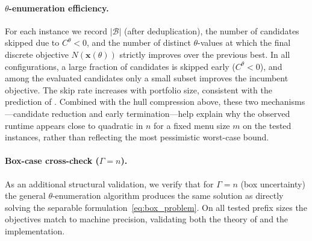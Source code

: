 \documentclass[11pt, a4paper]{article}
\theoremstyle{plain}
\theoremstyle{definition}
\theoremstyle{remark}
\begin{document}
\paragraph{$\theta$-enumeration efficiency.}
For each instance we record $|\mathcal B|$ (after deduplication), the number of candidates
skipped due to $C^\theta<0$, and the number of distinct $\theta$-values at which the final
discrete objective $N(\bm x(\theta))$ strictly improves over the previous best.
In all configurations, a large fraction of candidates is skipped early ($C^\theta<0$), and
among the evaluated candidates only a small subset improves the incumbent objective. The skip
rate increases with portfolio size, consistent with the prediction of
. Combined with the hull compression above, these
two mechanisms---candidate reduction and early termination---help explain why the observed runtime
appears close to quadratic in $n$ for a fixed menu size $m$ on the tested instances, rather than reflecting the most pessimistic worst-case bound.

\paragraph{Box-case cross-check ($\Gamma=n$).}
As an additional structural validation, we verify that for $\Gamma=n$ (box uncertainty) the
general $\theta$-enumeration algorithm produces the same solution as directly solving the
separable formulation~\eqref{eq:box_problem}. On all tested prefix sizes the objectives match
to machine precision, validating both the theory of  and the
implementation.
\end{document}
